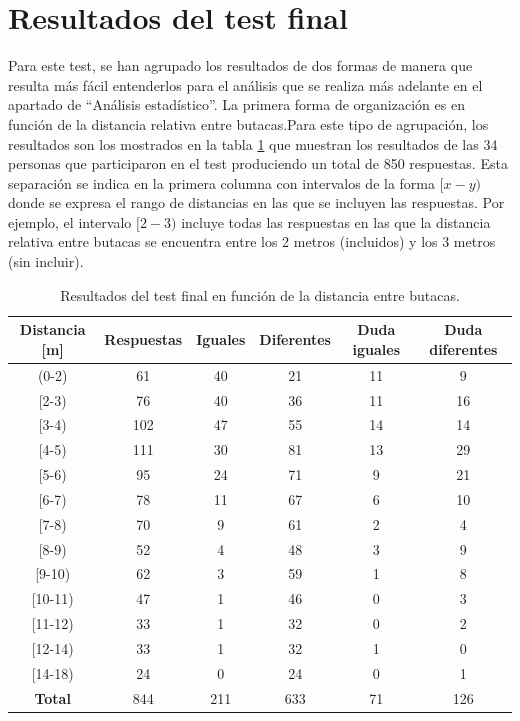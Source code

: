 \documentclass[11pt,a4paper]{book}
\begin{document}
	\section{Resultados del test final}
	    Para este test, se han agrupado los resultados de dos formas de manera que resulta más fácil entenderlos para el análisis que se realiza más adelante en el apartado de ``Análisis estadístico''. La primera forma de organización es en función de la distancia relativa entre butacas.Para este tipo de agrupación, los resultados son los mostrados en la tabla \ref{tablaTestButacas} que muestran los resultados de las 34 personas que participaron en el test produciendo un total de 850 respuestas. Esta separación se indica en la primera columna con intervalos de la forma $[x-y)$ donde se expresa el rango de distancias en las que se incluyen las respuestas. Por ejemplo, el intervalo $[2-3)$ incluye todas las respuestas en las que la distancia relativa entre butacas se encuentra entre los 2 metros (incluidos) y los 3 metros (sin incluir). 
	    
	    \begin{table}[H]
			\begin{center}
			\begin{scriptsize}
			\begin{tabular}{| c | c | c | c | c | c |}
			    \hline
				\textbf{Distancia [m]}&\textbf{Respuestas}&\textbf{Iguales}&\textbf{Diferentes}&\textbf{Duda iguales}&\textbf{Duda diferentes}\\ \hline
                (0-2)&61&40&21&11&9\\ \hline
                [2-3)&76&40&36&11&16\\ \hline
                [3-4)&102&47&55&14&14\\ \hline
                [4-5)&111&30&81&13&29\\ \hline
                [5-6)&95&24&71&9&21\\ \hline
                [6-7)&78&11&67&6&10\\ \hline
                [7-8)&70&9&61&2&4\\ \hline
                [8-9)&52&4&48&3&9\\ \hline
                [9-10)&62&3&59&1&8\\ \hline
                [10-11)&47&1&46&0&3\\ \hline
                [11-12)&33&1&32&0&2\\ \hline
                [12-14)&33&1&32&1&0\\ \hline
                [14-18)&24&0&24&0&1\\ \hline \hline
                \textbf{Total}&844&211&633&71&126\\ \hline
			\end{tabular}
			\caption{Resultados del test final en función de la distancia entre butacas.}
			\label{tablaTestButacas}
			\end{scriptsize}
			\end{center}	
		\end{table}
		
\end{document}
